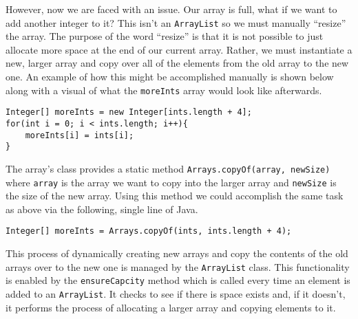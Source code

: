 \documentclass[a4paper]{article}
\begin{document}
However, now we are faced with an issue. Our array is full, what if we want to
add another integer to it? This isn't an \lstinline|ArrayList| so we must manually
``resize'' the array. The purpose of the word ``resize'' is that it is not possible to
just allocate more space at the end of our current array. Rather, we must instantiate 
a new, larger array and copy over all of the elements from the old array to the new 
one. An example of how this might be accomplished manually is shown below along
with a visual of what the \lstinline|moreInts| array would look like
afterwards.\\

\begin{minipage}{0.59\textwidth}
\begin{lstlisting}[frame=trBL, basicstyle=\small]
Integer[] moreInts = new Integer[ints.length + 4];
for(int i = 0; i < ints.length; i++){
	moreInts[i] = ints[i];
}
\end{lstlisting}
\end{minipage}
\hfill
\begin{minipage}{0.39\textwidth}
\begin{figure}[H]
	\centering
\end{figure}
\vspace{0.3cm}
\end{minipage}

The array's class provides a static method \lstinline|Arrays.copyOf(array, newSize)| 
where \lstinline|array| is the array we want to copy into the larger array and
\lstinline|newSize| is the size of the new array. Using this method we could accomplish the same 
task as above via the following, single line of Java.\\

\begin{lstlisting}[frame=trBL, basicstyle=\small]
Integer[] moreInts = Arrays.copyOf(ints, ints.length + 4);
\end{lstlisting}


This process of dynamically creating new arrays and copy the contents of the
old arrays over to the new one is managed by the \lstinline|ArrayList| class.
This functionality is enabled by the \lstinline|ensureCapcity| method which is
called every time an element is added to an \lstinline|ArrayList|. It checks to
see if there is space exists and, if it doesn't, it performs the process of
allocating a larger array and copying elements to it. 
\end{document}
